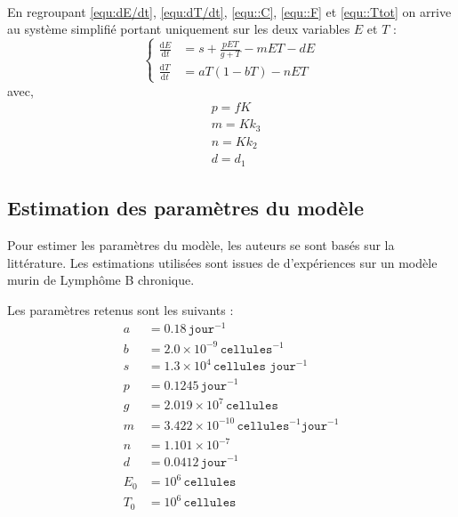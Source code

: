 \documentclass[12pt]{article}
\newcommand{\deriv}{\mathrm{d}}
\begin{document}
\paragraph{}En regroupant \ref{equ:dE/dt}, \ref{equ:dT/dt}, \ref{equ::C}, \ref{equ::F} et \ref{equ::Ttot} on arrive au système simplifié portant uniquement sur les deux variables $E$ et $T$ :
\begin{equation}
    \left\{\begin{aligned}
    \frac{\deriv E}{\deriv t} &= s + \frac{pET}{g+ T} - mET -dE\\
    \frac{\deriv T}{\deriv t} &= a T \left(1-bT\right) - nET
    \end{aligned}\right.
    \label{equ::model}
\end{equation}
avec, 
\begin{equation*}
\begin{aligned}
    &p = fK\\
    &m = Kk_3\\
    &n = Kk_2\\
    &d = d_1
\end{aligned}
\end{equation*}

\subsection{Estimation des paramètres du modèle}
Pour estimer les paramètres du modèle, les auteurs se sont basés sur la littérature. Les estimations utilisées sont issues de d'expériences sur un modèle murin de Lymphôme B chronique. 

Les paramètres retenus sont les suivants : 
\begin{align*}
    a &= 0.18 \,\texttt{jour}^{-1}\\
    b &= 2.0 \times 10^{-9} \,\texttt{cellules}^{-1}\\
    s &= 1.3 \times 10^4 \,\texttt{cellules jour}^{-1}\\
    p &= 0.1245  \,\texttt{jour}^{-1}\\
    g &= 2.019 \times 10^7  \,\texttt{cellules}\\
    m &= 3.422 \times 10^{-10} \,\texttt{cellules}^{-1} \texttt{jour}^{-1}\\
    n &= 1.101 \times 10^{-7} \\
    d &= 0.0412 \,\texttt{jour}^{-1}\\
    E_0 &= 10^6 \,\texttt{cellules}\\
    T_0 &= 10^6 \,\texttt{cellules}\\
\end{align*}
\end{document}
